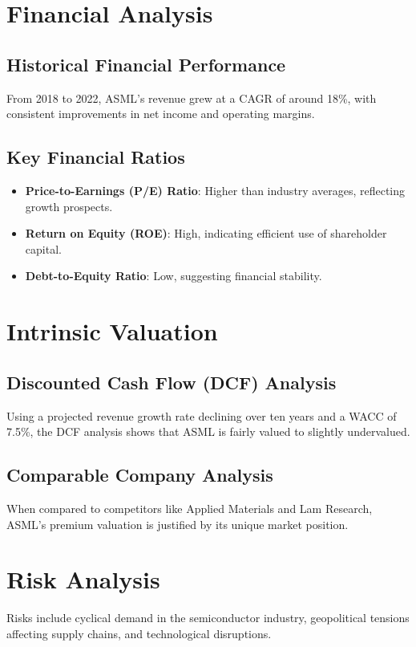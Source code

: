 \documentclass[12pt]{report}
\begin{document}
\section{Financial Analysis}
\subsection{Historical Financial Performance}
From 2018 to 2022, ASML's revenue grew at a CAGR of around 18\%, with consistent improvements in net income and operating margins.

\subsection{Key Financial Ratios}
\begin{itemize}
    \item \textbf{Price-to-Earnings (P/E) Ratio}: Higher than industry averages, reflecting growth prospects.
    \item \textbf{Return on Equity (ROE)}: High, indicating efficient use of shareholder capital.
    \item \textbf{Debt-to-Equity Ratio}: Low, suggesting financial stability.
\end{itemize}

\section{Intrinsic Valuation}
\subsection{Discounted Cash Flow (DCF) Analysis}
Using a projected revenue growth rate declining over ten years and a WACC of 7.5\%, the DCF analysis shows that ASML is fairly valued to slightly undervalued.

\subsection{Comparable Company Analysis}
When compared to competitors like Applied Materials and Lam Research, ASML's premium valuation is justified by its unique market position.

\section{Risk Analysis}
Risks include cyclical demand in the semiconductor industry, geopolitical tensions affecting supply chains, and technological disruptions.
\end{document}
